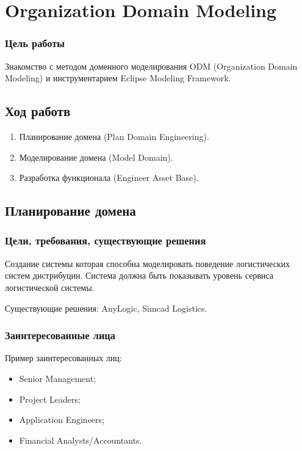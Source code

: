 


\newcommand{\labnumber}{1} %



\graphicspath{{figures/}}


\Ukrainian


\addtocounter{page}{1}

\section*{Organization Domain Modeling}
\subsubsection*{Цель работы}
Знакомство с методом доменного моделирования ODM (Organization Domain Modeling) и инструментарием Eclipse Modeling Framework.

\subsection*{Ход работв}
\begin{enumerate}
    \item Планирование домена (Plan Domain Engineering).
    \item Моделирование домена (Model Domain).
    \item Разработка функционала (Engineer Asset Base).
\end{enumerate}

\subsection{Планирование домена}
\subsubsection{Цели, требования, существующие решения}
Создание системы которая способна моделировать поведение логистических систем дистрибуции.
Система должна быть показывать уровень сервиса логистической системы.

Существующие решения:
AnyLogic, Simcad Logistics.

\subsubsection{Заинтересованные лица}
Пример заинтересованных лиц:
\begin{itemize}
    \item Senior Management;
    \item Project Leaders;
    \item Application Engineers;
    \item Financial Analysts/Accountants.
\end{itemize}
